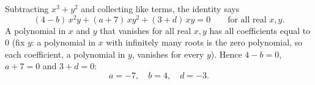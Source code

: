 Subtracting $x^3+y^2$ and collecting like terms, the identity says
\[(4-b)\,x^2y+(a+7)\,xy^2+(3+d)\,xy=0\qquad\text{for all real }x,y .\]
A polynomial in $x$ and $y$ that vanishes for all real $x,y$ has all coefficients equal to $0$ (fix $y$: a polynomial in $x$ with infinitely many roots is the zero polynomial, so each coefficient, a polynomial in $y$, vanishes for every $y$). Hence $4-b=0$, $a+7=0$ and $3+d=0$:
\[\boxed{a=-7,\quad b=4,\quad d=-3}.\]
